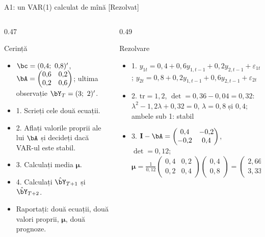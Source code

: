 \begin{frame}{A1: un VAR(1) calculat de mînă [Rezolvat]}
\itemsize{\scriptsize}
\begin{columns}[T]
\begin{column}{0.47\textwidth}
\begin{block}{Cerință}
\begin{itemize}
    \item $\bc = (0{,}4;\ 0{,}8)'$, $\bA = \begin{pmatrix} 0{,}6 & 0{,}2 \\ 0{,}2 & 0{,}6 \end{pmatrix}$; ultima observație $\bY_T = (3;\ 2)'$.
    \item 1. Scrieți cele două ecuații.
    \item 2. Aflați valorile proprii ale lui $\bA$ și decideți dacă VAR-ul este stabil.
    \item 3. Calculați media $\boldsymbol{\mu}$.
    \item 4. Calculați $\hat\bY_{T+1}$ și $\hat\bY_{T+2}$.
    \item Raportați: două ecuații, două valori proprii, $\boldsymbol{\mu}$, două prognoze.
\end{itemize}
\end{block}
\end{column}
\begin{column}{0.49\textwidth}
\begin{exampleblock}{Rezolvare}
\begin{itemize}
    \item 1. $y_{1t} = 0{,}4 + 0{,}6y_{1,t-1} + 0{,}2y_{2,t-1} + \varepsilon_{1t}$; $y_{2t} = 0{,}8 + 0{,}2y_{1,t-1} + 0{,}6y_{2,t-1} + \varepsilon_{2t}$
    \item 2. $\mathrm{tr} = 1{,}2$, $\det = 0{,}36 - 0{,}04 = 0{,}32$: $\lambda^2 - 1{,}2\lambda + 0{,}32 = 0$, $\lambda = 0{,}8$ și $0{,}4$; ambele sub 1: stabil
    \item 3. $\mathbf{I} - \bA = \begin{pmatrix} 0{,}4 & -0{,}2 \\ -0{,}2 & 0{,}4 \end{pmatrix}$, $\det = 0{,}12$; $\boldsymbol{\mu} = \frac{1}{0{,}12}\begin{pmatrix} 0{,}4 & 0{,}2 \\ 0{,}2 & 0{,}4 \end{pmatrix}\begin{pmatrix} 0{,}4 \\ 0{,}8 \end{pmatrix} = \begin{pmatrix} 2{,}667 \\ 3{,}333 \end{pmatrix}$

\end{itemize}
\end{exampleblock}
\end{column}
\end{columns}
\end{frame}
